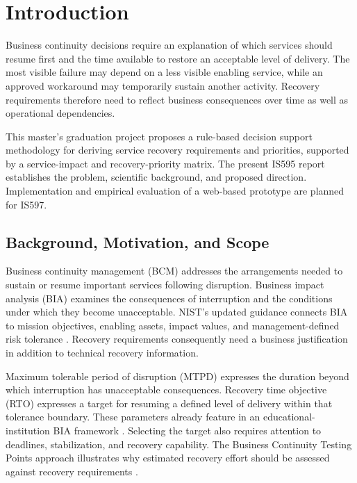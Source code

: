\chapter{Introduction}
\label{ch:introduction}

Business continuity decisions require an explanation of which services should resume first and the time available to restore an acceptable level of delivery. The most visible failure may depend on a less visible enabling service, while an approved workaround may temporarily sustain another activity. Recovery requirements therefore need to reflect business consequences over time as well as operational dependencies.

This master's graduation project proposes a rule-based decision support methodology for deriving service recovery requirements and priorities, supported by a service-impact and recovery-priority matrix. The present IS595 report establishes the problem, scientific background, and proposed direction. Implementation and empirical evaluation of a web-based prototype are planned for IS597.

\section{Background, Motivation, and Scope}
\label{sec:intro-motivation}

Business continuity management (BCM) addresses the arrangements needed to sustain or resume important services following disruption. Business impact analysis (BIA) examines the consequences of interruption and the conditions under which they become unacceptable. NIST's updated guidance connects BIA to mission objectives, enabling assets, impact values, and management-defined risk tolerance \cite{quinn2025bia}. Recovery requirements consequently need a business justification in addition to technical recovery information.

Maximum tolerable period of disruption (MTPD) expresses the duration beyond which interruption has unacceptable consequences. Recovery time objective (RTO) expresses a target for resuming a defined level of delivery within that tolerance boundary. These parameters already feature in an educational-institution BIA framework \cite{idrees2019bcis}. Selecting the target also requires attention to deadlines, stabilization, and recovery capability. The Business Continuity Testing Points approach illustrates why estimated recovery effort should be assessed against recovery requirements \cite{podaras2016tools}.

